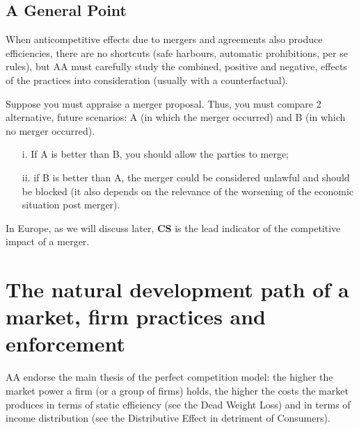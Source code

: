     \subsection{A General Point}
    
        When anticompetitive effects due to mergers and agreements also produce efficiencies, there are no shortcuts (safe harbours, automatic prohibitions, per se rules), but AA must carefully study the combined, positive and negative, effects of the practices into consideration (usually with a counterfactual). 
        
        Suppose you must appraise a merger proposal. Thus, you must compare 2 alternative, future scenarios: A (in which the merger occurred) and B (in which no merger occurred).
        \begin{enumerate}
            \item[i.] If A is better than B, you should allow the parties to merge;
            \item[ii.] if B is better than A, the merger could be considered unlawful and should be blocked (it also depends on the relevance of the worsening of the economic situation post merger).
        \end{enumerate}
        In Europe, as we will discuss later, \textcolor{BrickRed}{\textbf{CS}} is the lead indicator of the competitive impact of a merger.
    

\section{The natural development path of a market, firm practices and enforcement}

    AA endorse the main thesis of the perfect competition model: the higher the market power a firm (or a group of firms) holds, the higher the costs the market produces in terms of static efficiency (see the Dead Weight Loss) and in terms of income distribution (see the Distributive Effect in detriment of Consumers).


